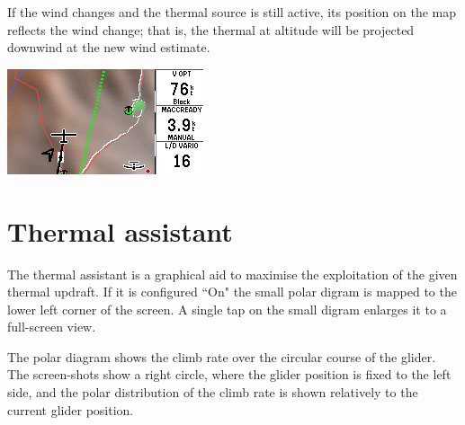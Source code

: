 If the wind changes and the thermal source is still active, its 
position on the map reflects the wind change; that is, the thermal 
at altitude will be projected downwind at the new wind estimate.

\begin{center}
\includegraphics[angle=0,width=0.8\linewidth,keepaspectratio='true']{figures/shot-tlocator-cruise.png}
\end{center}


\section{Thermal assistant}\label{sec:thermal-assistant}

The thermal assistant is a graphical aid to maximise the exploitation of the
given thermal updraft. If it is configured ``On"  the
small polar digram is mapped to the lower left corner of the screen. A
single tap on the small digram enlarges it to a full-screen view. 

The polar diagram shows the climb rate over the circular course of the glider.
The screen-shots show a right circle, where the glider position is fixed to the
left side, and the polar distribution of the climb rate is shown relatively to
the current glider position.


